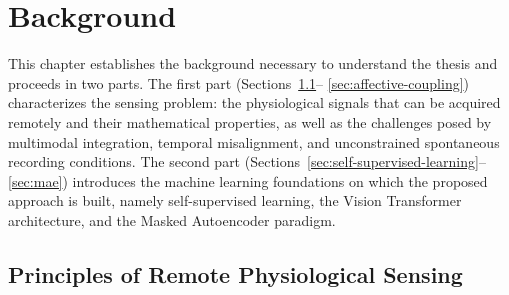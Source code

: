 \chapter{Background}
\label{ch:background}

This chapter establishes the background necessary to understand the thesis and
proceeds in two parts. The first part (Sections~\ref{sec:principles-rps}--
\ref{sec:affective-coupling}) characterizes the sensing problem: the
physiological signals that can be acquired remotely and their mathematical
properties, as well as the challenges posed by multimodal integration, temporal
misalignment, and unconstrained spontaneous recording conditions. The second
part (Sections~\ref{sec:self-supervised-learning}--\ref{sec:mae}) introduces
the machine learning foundations on which the proposed approach is built,
namely self-supervised learning, the Vision Transformer architecture, and the
Masked Autoencoder paradigm.

\section{Principles of Remote Physiological Sensing}
\label{sec:principles-rps}

